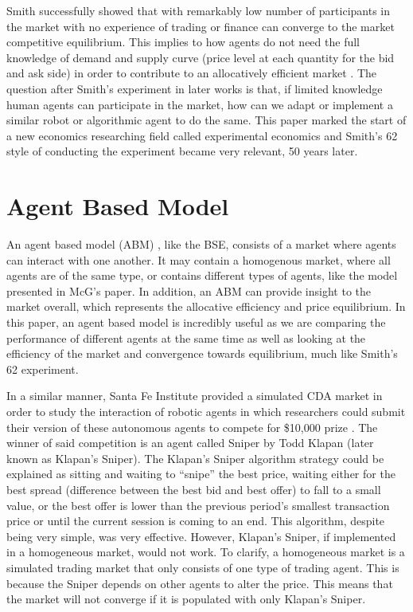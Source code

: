 Smith successfully showed that with remarkably low number of participants in the market with no experience of trading or finance can converge to the market competitive equilibrium. This implies to how agents do not need the full knowledge of demand and supply curve (price level at each quantity for the bid and ask side) in order to contribute to an allocatively efficient market \cite{smith1962}. The question after Smith’s experiment in later works is that, if limited knowledge human agents can participate in the market, how can we adapt or implement a similar robot or algorithmic agent to do the same. This paper marked the start of a new economics researching field called experimental economics and Smith’s 62 style of conducting the experiment became very relevant, 50 years later.

\section{Agent Based Model}
An agent based model (ABM) , like the BSE, consists of a market where agents can interact with one another. It may contain a homogenous market, where all agents are of the same type, or contains different types of agents, like the model presented in McG's paper. In addition, an ABM can provide insight to the market overall, which represents the allocative efficiency and price equilibrium. In this paper, an agent based model is incredibly useful as we are comparing the performance of different agents at the same time as well as looking at the efficiency of the market and convergence towards equilibrium, much like Smith’s 62 experiment.

In a similar manner, Santa Fe Institute provided a simulated CDA market in order to study the interaction of robotic agents in which researchers could submit their version of these autonomous agents to compete for \$10,000 prize \cite{Santafe}. The winner of said competition is an agent called Sniper by Todd Klapan (later known as Klapan’s Sniper). The Klapan’s Sniper algorithm strategy could be explained as sitting and waiting to “snipe” the best price, waiting either for the best spread (difference between the best bid and best offer) to fall to a small value, or the best offer is lower than the previous period’s smallest transaction price or until the current session is coming to an end. This algorithm, despite being very simple, was very effective. However, Klapan’s Sniper, if implemented in a  homogeneous market, would not work. To clarify, a homogeneous market is a simulated trading market that only consists of one type of trading agent. This is because the Sniper depends on other agents to alter the price. This means that the market will not converge if it is populated with only Klapan’s Sniper. 

